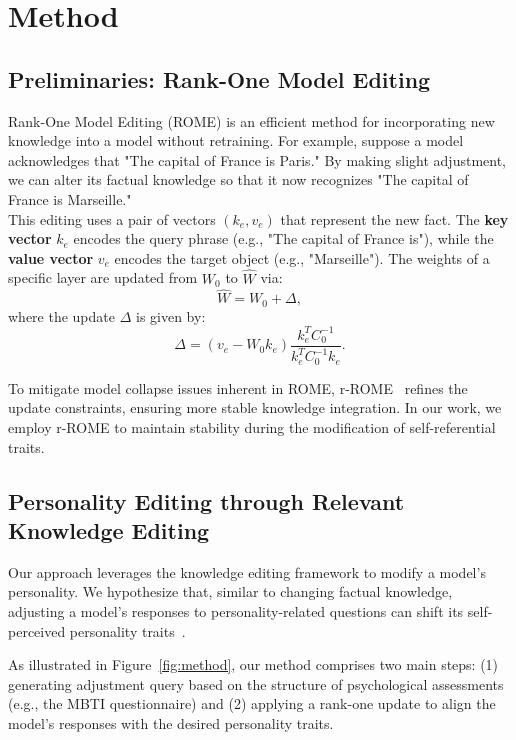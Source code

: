 \section{Method}

\subsection{Preliminaries: Rank-One Model Editing}
Rank-One Model Editing (ROME) is an efficient method for incorporating new knowledge into a 
model without retraining. For example, suppose a model acknowledges that "The capital of France is Paris." By making slight adjustment, 
 we can alter its factual knowledge so that it now recognizes "The capital of France is Marseille." \\ This editing uses a pair of vectors \((k_e, v_e)\) that represent the new fact.
 The \textbf{key vector} \(k_e\) encodes the query phrase (e.g., "The capital of France is"), while the \textbf{value vector} \(v_e\) encodes the target object (e.g., "Marseille"). The weights of a specific layer are updated from \(W_0\) to \(\hat{W}\) via:
\begin{equation}
    \hat{W} = W_0 + \Delta,
\end{equation}
where the update \(\Delta\) is given by:
\begin{equation}
    \Delta = (v_e - W_0 k_e) \frac{k_e^T C_0^{-1}}{k_e^T C_0^{-1} k_e}.
\end{equation}

To mitigate model collapse issues inherent in ROME,  r-ROME~\cite{gupta-etal-2024-rebuilding} refines the update constraints, ensuring more stable knowledge integration. In our work, we employ r-ROME to maintain stability during the modification of self-referential traits.

\subsection{Personality Editing through Relevant Knowledge Editing}
Our approach leverages the knowledge editing framework to modify a model's personality. We hypothesize that, similar to changing factual knowledge, adjusting a model’s responses to personality-related questions can shift its self-perceived personality traits~\cite{Jang2022, Sturgis2023, 10.1111/jopy.12683}.

As illustrated in Figure~\ref{fig:method}, our method comprises two main steps: (1) generating adjustment query based on the structure of psychological assessments (e.g., the MBTI questionnaire) and (2) applying a rank-one update to align the model's responses with the desired personality traits.

